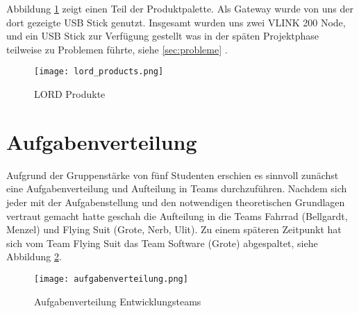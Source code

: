 Abbildung \ref{fig:lordproducts} zeigt einen Teil der Produktpalette.
Als Gateway wurde von uns der dort gezeigte USB Stick genutzt.
Insgesamt wurden uns zwei VLINK 200 Node, und ein USB Stick zur Verfügung gestellt was in der späten Projektphase teilweise zu Problemen führte,
siehe \ref{sec:probleme} .

\begin{figure}[h]
    \begin{center}
        \texttt{[image: lord\_products.png]}
        \caption[LORD Produkte (Abbildungsverzeichnis)]{LORD Produkte
        \cite{VLInkManual}
        }
        \label{fig:lordproducts}
    \end{center}
\end{figure}

\section{Aufgabenverteilung}
Aufgrund der Gruppenstärke von fünf Studenten erschien es sinnvoll zunächst eine Aufgabenverteilung und Aufteilung in Teams durchzuführen.
Nachdem sich jeder mit der Aufgabenstellung und den notwendigen theoretischen Grundlagen vertraut gemacht hatte geschah die Aufteilung in die Teams Fahrrad (Bellgardt, Menzel) und Flying Suit (Grote, Nerb, Ulit).
Zu einem späteren Zeitpunkt hat sich vom Team Flying Suit das Team Software (Grote) abgespaltet, siehe Abbildung \ref{fig:aufgabenverteilung}.

\begin{figure}[h]
    \begin{center}
        \texttt{[image: aufgabenverteilung.png]}
        \caption[Aufgabenverteilung Entwicklungsteams (Abbildungsverzeichnis)]{Aufgabenverteilung Entwicklungsteams
        }
        \label{fig:aufgabenverteilung}
    \end{center}
\end{figure}